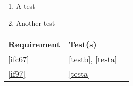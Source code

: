 
\begin{enumerate}[label=Test\alph*.,ref=Test\alph*,nosep]
	\item \label{testa} A test
	\item \label{testb} Another test
\end{enumerate}

\begin{tabular}{|l|l|l|}
	\hline
	Requirement & Test(s) \\
	\hline
	\hline
	\ref{ifc67} & \ref{testb}, \ref{testa} \\
	\hline
	\ref{if97} & \ref{testa} \\
	\hline
\end{tabular}

	
